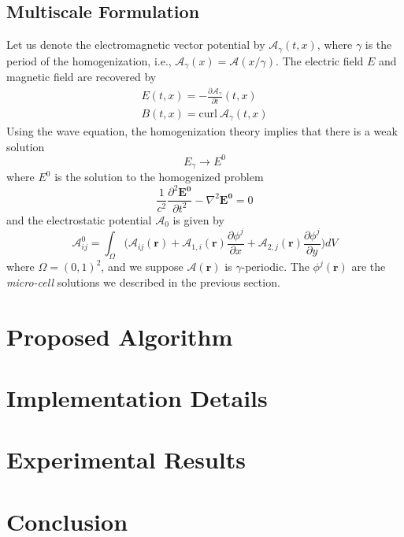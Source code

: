 \documentclass{article}[12pt]
\theoremstyle{plain}
\begin{document}
\subsection{Multiscale Formulation}
Let us denote the electromagnetic vector potential by $\mathcal{A}_\gamma(t,x)$, where
$\gamma$ is the period of the homogenization, i.e., $\mathcal{A}_\gamma(x) = \mathcal{A}(x/\gamma)$.
The electric field $E$ and magnetic
field are recovered by
\begin{eqnarray}
  E(t,x) = - \frac{\partial \mathcal{A}_\gamma}{\partial t}(t,x) \\
  B(t,x) = \mathrm{curl}\ \mathcal{A}_\gamma(t,x)
\end{eqnarray}
Using the wave equation, the homogenization theory implies that there is a weak solution
\[
E_\gamma \to E^0
\]
where $E^0$ is the solution to the homogenized problem
\[
\frac{1}{c^2} \frac{\partial^2 \mathbf{E^0}}{\partial t^2} - \nabla^2\mathbf{E^0} = 0
\]
and the electrostatic potential $\mathcal{A}_0$ is given by
\[
\mathcal{A}_{ij}^0 = \int_\Omega \Big(\mathcal{A}_{ij}(\mathbf{r}) + 
\mathcal{A}_{1,i}(\mathbf{r}) \frac{\partial \phi^j}{\partial x} +
\mathcal{A}_{2,j}(\mathbf{r}) \frac{\partial \phi^j}{\partial y}\Big) dV
\]
where $\Omega=(0,1)^2$, and we suppose $\mathcal{A}(\mathbf{r})$ is $\gamma$-periodic.
The $\phi^j(\mathbf{r})$ are the \emph{micro-cell} solutions we described in the
previous section.

\section{Proposed Algorithm}
\label{section:proposed_algorithm}
\begin{algorithm}

\end{algorithm}

\section{Implementation Details}
\section{Experimental Results}

\section{Conclusion}



\end{document}
